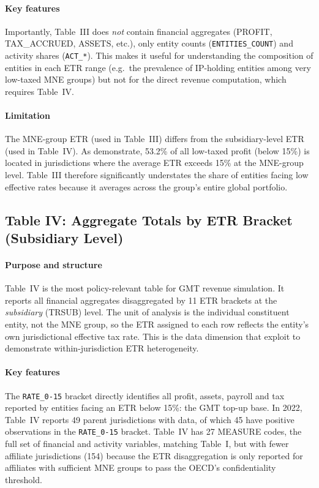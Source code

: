 \documentclass[11pt,a4paper]{article}
\newcommand{\code}[1]{\texttt{#1}}
\begin{document}
\paragraph{Key features}
Importantly, Table~III does \emph{not} contain financial aggregates (PROFIT, TAX\_ACCRUED, ASSETS, etc.), only entity counts (\code{ENTITIES\_COUNT}) and activity shares (\code{ACT\_*}). This makes it useful for understanding the composition of entities in each ETR range (e.g.\ the prevalence of IP-holding entities among very low-taxed MNE groups) but not for the direct revenue computation, which requires Table~IV.

\paragraph{Limitation}
The MNE-group ETR (used in Table~III) differs from the subsidiary-level ETR (used in Table~IV). As \citet{hugger2025} demonstrate, 53.2\% of all low-taxed profit (below 15\%) is located in jurisdictions where the average ETR exceeds 15\% at the MNE-group level. Table~III therefore significantly understates the share of entities facing low effective rates because it averages across the group's entire global portfolio.

\subsection{Table IV: Aggregate Totals by ETR Bracket (Subsidiary Level)}\label{sec:table4}

\paragraph{Purpose and structure}
Table~IV is the most policy-relevant table for GMT revenue simulation. It reports all financial aggregates disaggregated by 11 ETR brackets at the \emph{subsidiary} (TRSUB) level. The unit of analysis is the individual constituent entity, not the MNE group, so the ETR assigned to each row reflects the entity's own jurisdictional effective tax rate. This is the data dimension that \citet{hugger2025} exploit to demonstrate within-jurisdiction ETR heterogeneity.

\paragraph{Key features}
The \code{RATE\_0-15} bracket directly identifies all profit, assets, payroll and tax reported by entities facing an ETR below 15\%: the GMT top-up base. In 2022, Table~IV reports 49 parent jurisdictions with data, of which 45 have positive observations in the \code{RATE\_0-15} bracket. Table~IV has 27 MEASURE codes, the full set of financial and activity variables, matching Table~I, but with fewer affiliate jurisdictions (154) because the ETR disaggregation is only reported for affiliates with sufficient MNE groups to pass the OECD's confidentiality threshold.
\end{document}
